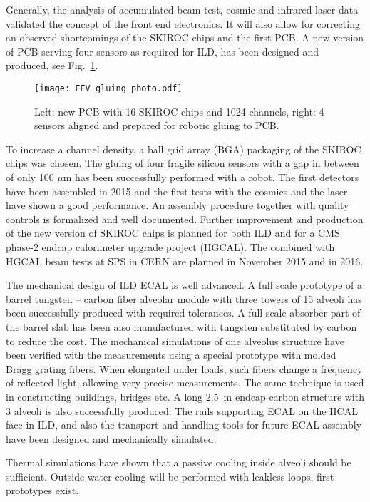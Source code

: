 \documentclass{article}
\begin{document}
Generally, the analysis of accumulated beam test, cosmic and infrared laser
data validated the concept of the front end electronics. It will also allow
for correcting an observed shortcomings of the SKIROC chips and the first
PCB. A new version of PCB serving four sensors as required for ILD, has been
designed and produced, see Fig.~\ref{ild_siw_ecal_fev}.
\begin{figure}
\centering
\texttt{[image: FEV\_gluing\_photo.pdf]}
\caption{Left: new PCB with 16 SKIROC chips and 1024 channels, right: 4 sensors
  aligned and prepared for robotic gluing to PCB.}
\label{ild_siw_ecal_fev}
\end{figure}
To increase a channel density, a ball grid array
(BGA) packaging of the SKIROC chips was chosen. The gluing of four fragile silicon
sensors with a gap in between of only 100 $\mu$m has been successfully
performed with a robot. The first detectors have been assembled in 2015 and
the first tests with the cosmics and the laser have shown a good performance. An assembly
procedure together with quality controls is formalized and well documented.
Further improvement and production of the new version of SKIROC chips is planned
for both ILD and for a CMS phase-2 endcap calorimeter upgrade project
(HGCAL). The combined with HGCAL beam tests at SPS in CERN are planned in
November 2015 and in 2016.

The mechanical design of ILD ECAL is well advanced. A full scale prototype of
a barrel tungsten -- carbon fiber alveolar module with three towers of 15
alveoli has been successfully produced with required tolerances. A full scale
absorber part of the barrel slab has been also manufactured with tungsten
substituted by carbon to reduce the cost. The mechanical simulations of one
alveolus structure have been verified with the measurements using a special
prototype with molded Bragg grating fibers. When elongated under loads, such
fibers change a frequency of reflected light, allowing very precise
measurements. The same technique is used in constructing buildings, bridges
etc.  A long 2.5~m endcap carbon structure with 3 alveoli is also
successfully produced. The rails supporting ECAL on the HCAL face in ILD, and
also the transport and handling tools for future ECAL assembly have been
designed and mechanically simulated.

Thermal simulations have shown that a passive cooling inside alveoli should be
sufficient. Outside water cooling will be performed with leakless loops, first
prototypes exist.
\end{document}

